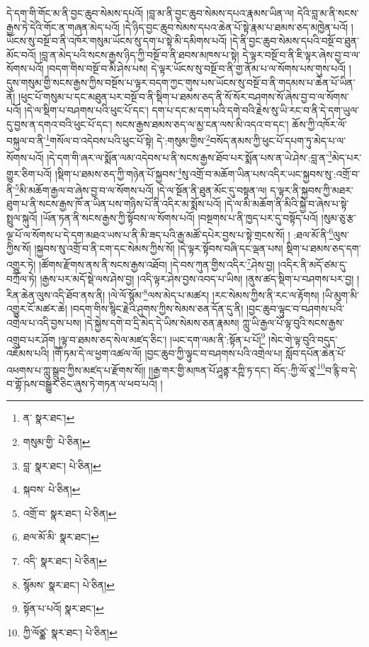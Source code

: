 དེ་དག་གི་གོང་མ་ནི་བྱང་ཆུབ་སེམས་དཔའོ། །བླ་མ་ནི་བྱང་ཆུབ་སེམས་དཔའ་རྣམས་ཡིན་ལ། དེའི་བླ་མ་ནི་སངས་རྒྱས་ཏེ་དེའི་གོང་ན་གཞན་མེད་པའོ། །དེ་ཉིད་བྱང་ཆུབ་སེམས་དཔའ་ཆེན་པོ་སྟེ་རྣམ་པ་ཐམས་ཅད་མཁྱེན་པའོ། །ཡོངས་སུ་བསྔོ་བ་ནི་འཁོར་གསུམ་ཡོངས་སུ་དག་པ་སྟེ་མི་དམིགས་པའོ། །དེ་ནི་བྱང་ཆུབ་སེམས་དཔའི་བསྔོ་བ་ཐུན་མོང་བའོ། །བླ་ན་མེད་པའི་སངས་རྒྱས་ཉིད་ཀྱི་བསྔོ་བ་ནི་ཐབས་མཁས་པ་སྟེ། དེ་ལྟར་བསྔོ་བ་ནི་ཇི་ལྟར་ཞེས་བྱ་བ་ལ་སོགས་པའོ། །བདག་གིས་བསྔོ་བ་མི་ཤེས་པས། དེ་ལྟར་ཡོངས་སུ་བསྔོ་བ་ནི་གྱ་ནོམ་པ་ལ་སོགས་པས་གུས་པའོ། །དུས་གསུམ་གྱི་སངས་རྒྱས་ཀྱིས་བསྔོས་པ་ལྟར་བདག་ཀྱང་གུས་པས་ཡོངས་སུ་བསྔོ་བ་ནི་གདམས་པ་ཆེན་པོ་ཡིན་ནོ། །ཕུང་པོ་གསུམ་པ་དང་མཐུན་པར་བསྔོ་བ་ནི་སྡིག་པ་ཐམས་ཅད་ནི་སོ་སོར་བཤགས་སོ་ཞེས་བྱ་བ་ལ་སོགས་པའོ། །དེ་ལ་སྡིག་པ་བཤགས་པའི་ཕུང་པོ་དང་། དག་པ་དང་མ་དག་པའི་དགེ་བའི་རྗེས་སུ་ཡི་རང་བ་ནི་དེ་དག་ཡུལ་དུ་བྱས་ན་དགའ་བའི་ཕུང་པོ་དང་། སངས་རྒྱས་ཐམས་ཅད་ལ་མྱ་ངན་ལས་མི་འདའ་བ་དང་། ཆོས་ཀྱི་འཁོར་ལོ་བསྐུལ་བ་ནི་\footnote{ན་  སྣར་ཐང་། }གསོལ་བ་འདེབས་པའི་ཕུང་པོ་སྟེ། དེ་:གསུམ་གྱིས་\footnote{གསུམ་གྱི་  པེ་ཅིན། }བསོད་ནམས་ཀྱི་ཕུང་པོ་དཔག་ཏུ་མེད་པ་ལ་སོགས་པའོ། །དེ་དག་གི་ཞར་ལ་སྨོན་ལམ་འདེབས་པ་ནི་སངས་རྒྱས་ཐོབ་པར་སྨོན་པས་ན་ཡེ་ཤེས་:བླ་ན་\footnote{བླ་  སྣར་ཐང་།  པེ་ཅིན། }མེད་པར་གྱུར་ཅིག་པའོ། །སྡིག་པ་ཐམས་ཅད་ཀྱི་གཉེན་པོ་སྐྱབས་\footnote{སྐབས་  པེ་ཅིན། }སུ་འགྲོ་བ་མཆོག་ཡིན་པས་འདིར་ཡང་སྐྱབས་སུ་:འགྲོ་བ་ནི་\footnote{འགྲོ་བ་  སྣར་ཐང་།  པེ་ཅིན། }མི་མཆོག་རྒྱལ་བ་ཞེས་བྱ་བ་ལ་སོགས་པའོ། །དེ་ལ་སྔོན་ནི་ཐུན་མོང་དུ་བསྟན་ལ། ད་ལྟར་ནི་སྐྱབས་ཀྱི་མཐར་ཐུག་པ་ནི་སངས་རྒྱས་ཁོ་ན་ཡིན་པས་གཉིས་པོ་ནི་འདིར་མ་སྨོས་པའོ། །དེ་ལ་མི་མཆོག་ནི་མིའི་སྐྱེ་བ་ཞེས་པ་སྟེ་སྤྲུལ་སྐུའོ། །ཡོན་ཏན་ནི་སངས་རྒྱས་ཀྱི་སྟོབས་ལ་སོགས་པའོ། །བསྔགས་པ་ནི་ཁྱད་པར་དུ་བསྟོད་པའོ། །སུམ་ཅུ་རྩ་ལྔ་པོ་ལ་སོགས་པ་དེ་དག་མཐའ་ཡས་པ་ནི་མི་ཟད་པའི་རྒྱ་མཚོ་དཔེར་བྱས་པ་སྟེ་གྲངས་སོ། །
:ཐལ་མོ་ནི་\footnote{ཐལ་མོ་མི་  སྣར་ཐང་། }ལུས་ཀྱིས་སོ། །སྐྱབས་སུ་འགྲོ་བ་ནི་ངག་དང་སེམས་ཀྱིས་སོ། །དེ་ལྟར་སྟོབས་བཞི་དང་ལྡན་པས། སྡིག་པ་ཐམས་ཅད་དག་འགྱུར་ཏེ། །ཚོགས་རྫོགས་ནས་ནི་སངས་རྒྱས་འཐོབ། །དེ་བས་ཀུན་གྱིས་འདིར་\footnote{འདི་  སྣར་ཐང་།  པེ་ཅིན། }ཤེས་བྱ། །འདིར་ནི་མདོ་ཙམ་དུ་བཀྲོལ་ཏེ། །རྒྱས་པར་མདོ་སྡེ་ལས་ཤེས་བྱ། །འདི་ལྟར་ཤེས་བྱས་འབད་པ་ཡིས། །ནུས་ཚད་སྡིག་པ་བཤགས་པར་བྱ། །རིན་ཆེན་ལུས་འདི་ཐོབ་ནས་ནི། །ལེ་ལོ་སྙོམ་\footnote{སྙོམས་  སྣར་ཐང་།  པེ་ཅིན། }ལས་མེད་པ་མཚར། །རང་སེམས་ཀྱིས་ནི་རང་ལ་རྟོགས། །ཡི་མུག་མི་འགྱུར་ངོ་མཚར་ཆེ། །བདག་གིས་སྙིང་རྗེའི་ཤུགས་ཀྱིས་སེམས་ཅན་དོན་དུ་ནི། །བྱང་ཆུབ་ལྟུང་བ་བཤགས་པའི་འགྲེལ་པ་འདི་བྱས་པས། །དེ་སྐྱེས་དགེ་བ་དྲི་མེད་དེ་ཡིས་སེམས་ཅན་རྣམས། ཀླུ་ཡི་རྒྱལ་པོ་ལྟ་བུའི་སངས་རྒྱས་འགྲུབ་པར་ཤོག །ལྟ་བ་ཐམས་ཅད་སེལ་མཛད་ཅིང་། །ཡང་དག་ལམ་ནི་:སྟོན་པ་པོ།\footnote{སྟོན་པ་པའོ།  སྣར་ཐང་། } །སེང་གེ་ལྟ་བུའི་བདུད་འཇོམས་པའི། །གཽ་ཏམ་དེ་ལ་ཕྱག་འཚལ་ལོ། །བྱང་ཆུབ་ཀྱི་ལྟུང་བ་བཤགས་པའི་འགྲེལ་པ། སློབ་དཔོན་ཆེན་པོ་འཕགས་པ་ཀླུ་སྒྲུབ་ཀྱིས་མཛད་པ་རྫོགས་སོ།། །།རྒྱ་གར་གྱི་མཁན་པོ་ཤཱནྟ་རཀྵི་ཏ་དང་། བོད་:ཀྱི་ལོ་ཙཱ་\footnote{ཀྱི་ལོཙྪ་  སྣར་ཐང་།  པེ་ཅིན། }བ་རྙི་བ་དེ་བ་གྷོ་ཥས་བསྒྱུར་ཅིང་ཞུས་ཏེ་གཏན་ལ་ཕབ་པའོ། །